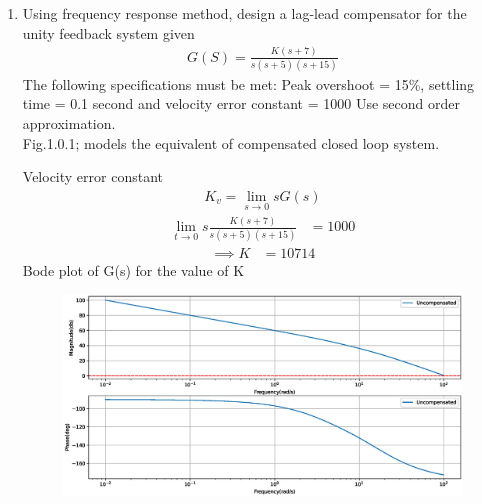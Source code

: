 \begin{enumerate}[label=\thesubsection.\arabic*.,ref=\thesubsection.\theenumi]
\item Using frequency response method, design a lag-lead compensator for the unity feedback system given \\
\begin{align}
G(S) = \frac{K(s+7)}{s(s+5)(s+15)}
\end{align}
The following specifications must be met: Peak overshoot = 15\%, settling time = 0.1 second and velocity error constant = 1000
Use second order approximation. \\
%
\solution Fig.1.0.1; models the equivalent of compensated closed loop system. 
 \begin{figure}[!ht]
	\begin{center}
		\resizebox{\columnwidth}{!}{}
	\end{center}
\caption{}
\label{fig:1;}
\end{figure}
%

Velocity error constant  
\begin{align}
K_{v} =  \lim_{s \to 0}sG(s)
\end{align}
\begin{align}
\lim_{t \to 0}s\frac{K(s+7)}{s(s+5)(s+15)} &= 1000
\end{align}
\begin{align}
\implies K &= 10714
\end{align}
Bode plot of G(s) for the value of K

\begin{figure}[!ht]
\centering
  \includegraphics[width=\columnwidth]{./figs/ee18btech11012/ee18btech11012.eps}
\caption{}
\label{fig:ee18btech11012}
\end{figure}



\end{enumerate}
